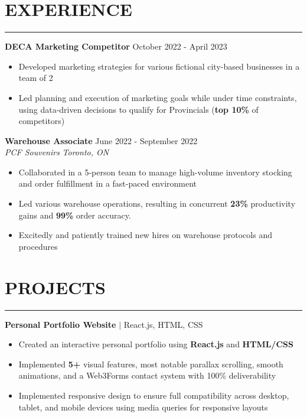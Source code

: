 \documentclass[letterpaper,10.5pt]{article}
\begin{document}
\section*{\textnormal{EXPERIENCE}}\vspace{-19pt}
\noindent\rule{\textwidth}{0.2 pt}
\vspace{5pt}
\textbf{DECA Marketing Competitor}
\hfill
October 2022 - April 2023
\begin{itemize}
    \setlength\itemsep{1pt}
    \item Developed marketing strategies for various fictional city-based businesses in a team of 2
    \item Led planning and execution of marketing goals while under time constraints, using data-driven decisions to qualify for Provincials (\textbf{top 10\%} of competitors)
\end{itemize}
\vspace{5pt}
\textbf{Warehouse Associate}
\hfill
June 2022 - September 2022\\
\emph{PCF Souvenirs}
\hfill
\emph{Toronto, ON}
\begin{itemize}
    \setlength\itemsep{1pt}
    \item Collaborated in a 5-person team to manage high-volume inventory stocking and order fulfillment in a fast-paced environment
    \item Led various warehouse operations, resulting in concurrent \textbf{23\%} productivity gains and \textbf{99\%} order accuracy.
    \item Excitedly and patiently trained new hires on warehouse protocols and procedures
\end{itemize}

\section*{\textnormal{PROJECTS}}\vspace{-19pt}
\noindent\rule{\textwidth}{0.2 pt}

\noindent\textbf{Personal Portfolio Website} $|$ React.js, HTML, CSS
\begin{itemize}
    \setlength\itemsep{1pt}
    \item Created an interactive personal portfolio using \textbf{React.js} and \textbf{HTML/CSS}
    \item Implemented \textbf{5+} visual features, most notable parallax scrolling, smooth animations, and a Web3Forms contact system with 100\% deliverability
    \item Implemented responsive design to ensure full compatibility across desktop, tablet, and mobile devices using media queries for responsive layouts
\end{itemize}
\end{document}
